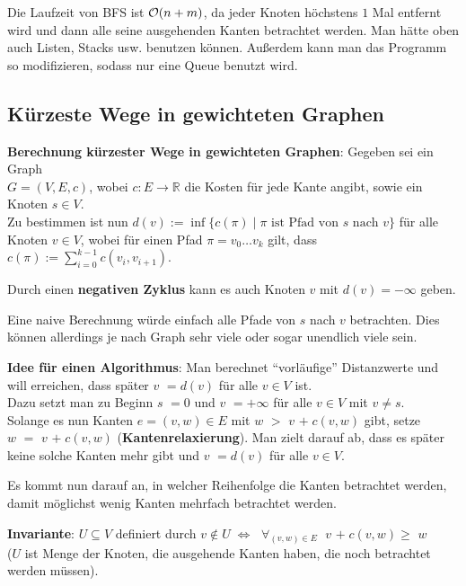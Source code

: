 Die Laufzeit von BFS ist $\mathcal{O}(n + m)$, da jeder Knoten höchstens $1$ Mal
entfernt wird und dann alle seine ausgehenden Kanten betrachtet werden.
Man hätte oben auch Listen, Stacks usw. benutzen können.
Außerdem kann man das Programm so modifizieren, sodass nur eine
Queue benutzt wird.

\pagebreak

\subsection{%
    Kürzeste Wege in gewichteten Graphen%
}

\textbf{Berechnung kürzester Wege in gewichteten Graphen}:
Gegeben sei ein Graph \\
$G = (V, E, c)$, wobei $c: E \rightarrow \mathbb{R}$
die Kosten für jede Kante angibt, sowie ein Knoten $s \in V$. \\
Zu bestimmen ist nun
$d(v) := \inf\{c(\pi) \;|\; \pi \text{ ist Pfad von } s \text{ nach } v\}$
für alle Knoten $v \in V$, wobei für einen Pfad
$\pi = v_0 \dotsc v_k$ gilt, dass
$c(\pi) := \sum_{i=0}^{k-1} c(v_i, v_{i+1})$.

Durch einen \textbf{negativen Zyklus} kann es auch Knoten $v$ mit
$d(v) = -\infty$ geben.

Eine naive Berechnung würde einfach alle Pfade von $s$ nach $v$ betrachten.
Dies können allerdings je nach Graph sehr viele oder sogar unendlich viele
sein.

\linie

\textbf{Idee für einen Algorithmus}:
Man berechnet "`vorläufige"' Distanzwerte  und will erreichen,
dass später \code{dist[}$v$\code{]} $= d(v)$ für alle $v \in V$ ist. \\
Dazu setzt man zu Beginn \code{dist[}$s$\code{]} $= 0$ und
\code{dist[}$v$\code{]} $= +\infty$ für alle $v \in V$ mit $v \not= s$. \\
Solange es nun Kanten $e = (v, w) \in E$ mit
\code{dist[}$w$\code{]} $>$ \code{dist[}$v$\code{]} $+\; c(v,w)$ gibt, setze \\
\code{dist[}$w$\code{]} $=$ \code{dist[}$v$\code{]} $+\; c(v,w)$
(\textbf{Kantenrelaxierung}).
Man zielt darauf ab, dass es später keine solche Kanten mehr gibt
und \code{dist[}$v$\code{]} $= d(v)$ für alle $v \in V$.

Es kommt nun darauf an, in welcher Reihenfolge die Kanten betrachtet werden,
damit möglichst wenig Kanten mehrfach betrachtet werden.

\textbf{Invariante}:
$U \subseteq V$ definiert durch $v \notin U \;\Leftrightarrow\;$
$\forall_{(v,w) \in E}\;$
\code{dist[}$v$\code{]} $+\; c(v,w) \ge$ \code{dist[}$w$\code{]} \\
($U$ ist Menge der Knoten, die ausgehende Kanten haben, die noch
betrachtet werden müssen).

